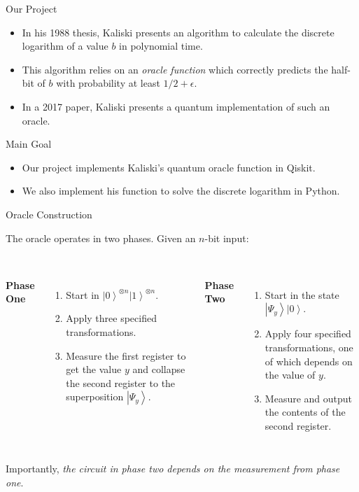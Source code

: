 \documentclass{beamer}
\newcommand{\ket}[1]{\left|{#1}\right\rangle}
\begin{document}

\begin{frame}{Our Project}

\begin{itemize}
    \item In his 1988 thesis, Kaliski presents an algorithm to calculate the discrete logarithm of a value $b$ in polynomial time. \cite{logarithm}
    \item This algorithm relies on an \textit{oracle function} which correctly predicts the half-bit of $b$ with probability at least $1/2 + \epsilon$.
    \item In a 2017 paper, Kaliski presents a quantum implementation of such an oracle. \cite{oracle}
\end{itemize}

\begin{block}{Main Goal}
\begin{itemize}
    \item Our project implements Kaliski's quantum oracle function in Qiskit.
    \item We also implement his function to solve the discrete logarithm in Python.
\end{itemize}
\end{block}

\end{frame}


\begin{frame}{Oracle Construction}

The oracle operates in two phases. Given an $n$-bit input: \\~\\

\begin{columns}[t]

\textbf{Phase One}
\begin{enumerate}
    \item Start in $\ket{0}^{\otimes n}\ket{1}^{\otimes n}$.
    \item Apply three specified transformations.
    \item Measure the first register to get the value $y$ and collapse the second register to the superposition $\ket{\Psi_y}$. \\~\\
\end{enumerate}
\textbf{Phase Two}
\begin{enumerate}
    \item Start in the state $\ket{\Psi_y}\ket{0}$.
    \item Apply four specified transformations, one of which depends on the value of $y$.
    \item Measure and output the contents of the second register.
\end{enumerate}
\end{columns}

Importantly, \textit{the circuit in phase two depends on the measurement from phase one}.

\end{frame}
\end{document}
